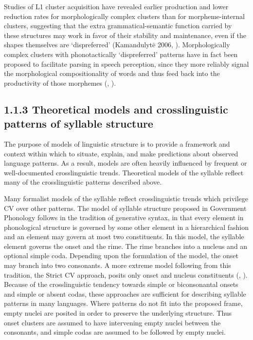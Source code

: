  Studies of L1 cluster acquisition have revealed earlier production and lower reduction rates for morphologically complex clusters than for morpheme-internal clusters, suggesting that the extra grammatical-semantic function carried by these structures may work in favor of their stability and maintenance, even if the shapes themselves are ‘dispreferred’ (Kamandulyt\.e 2006, \citealt{Zydorowicz2010}). Morphologically complex clusters with phonotactically ‘dispreferred’ patterns have in fact been proposed to facilitate parsing in speech perception, since they more reliably signal the morphological compositionality of words and thus feed back into the productivity of those morphemes (\citealt{HayBaayen2003}, \citealt{DresslerEtAl2010}). 

\subsection{1.1.3 Theoretical models and crosslinguistic patterns of syllable structure}

  The purpose of models of linguistic structure is to provide a framework and context within which to situate, explain, and make predictions about observed language patterns. As a result, models are often heavily influenced by frequent or well-documented crosslinguistic trends. Theoretical models of the syllable reflect many of the crosslinguistic patterns described above. 

  Many formalist models of the syllable reflect crosslinguistic trends which privilege CV over other patterns. The model of syllable structure proposed in Government Phonology \citep{KayeEtAl1990} follows in the tradition of generative syntax, in that every element in phonological structure is governed by some other element in a hierarchical fashion and an element may govern at most two constituents. In this model, the syllable element governs the onset and the rime. The rime branches into a nucleus and an optional simple coda. Depending upon the formulation of the model, the onset may branch into two consonants. A more extreme model following from this tradition, the Strict CV approach, posits only onset and nucleus constituents (\citealt{Lowenstamm1996}, \citealt{Scheer2004}). Because of the crosslinguistic tendency towards simple or biconsonantal onsets and simple or absent codas, these approaches are sufficient for describing syllable patterns in many languages. Where patterns do not fit into the proposed frame, empty nuclei are posited in order to preserve the underlying structure. Thus onset clusters are assumed to have intervening empty nuclei between the consonants, and simple codas are assumed to be followed by empty nuclei.

